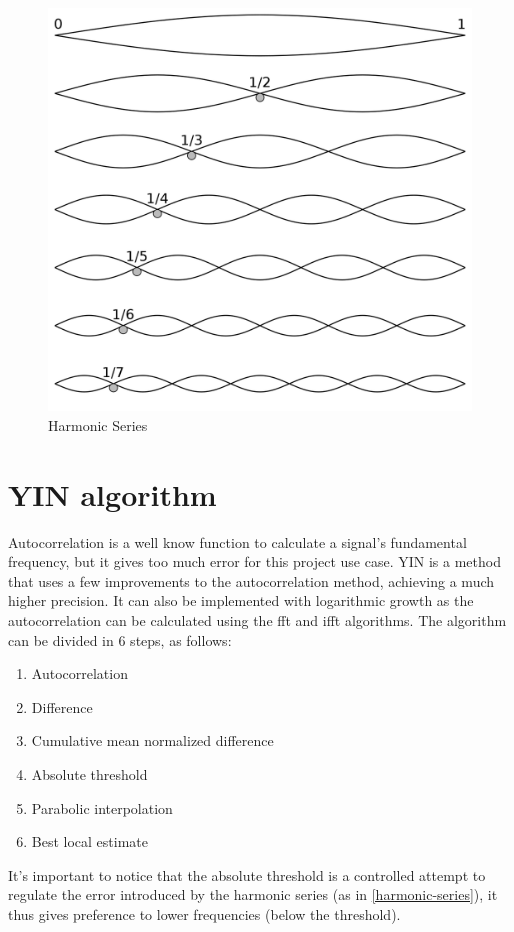 \begin{figure}[htb]
	\caption{Harmonic Series}
  \label{harmonic-series}
	\begin{center}
    \includegraphics[scale=0.15]{images/harmonic-series.png}
	\end{center}
\end{figure}

\section{YIN algorithm}
Autocorrelation is a well know function to calculate a signal's fundamental
frequency, but it gives too much error for this project use case. YIN \cite{YINArticle}
is a method that uses a few improvements to the autocorrelation method, achieving
a much higher precision. It can also be implemented with logarithmic growth as the
autocorrelation can be calculated using the fft and ifft algorithms. The algorithm
can be divided in 6 steps, as follows:
\begin{enumerate}
  \item Autocorrelation
  \item Difference
  \item Cumulative mean normalized difference
  \item Absolute threshold
  \item Parabolic interpolation
  \item Best local estimate
\end{enumerate}
It's important to notice that the absolute threshold is a controlled attempt to regulate
the error introduced by the harmonic series (as in \autoref{harmonic-series}),
it thus gives preference to lower frequencies (below the threshold).

